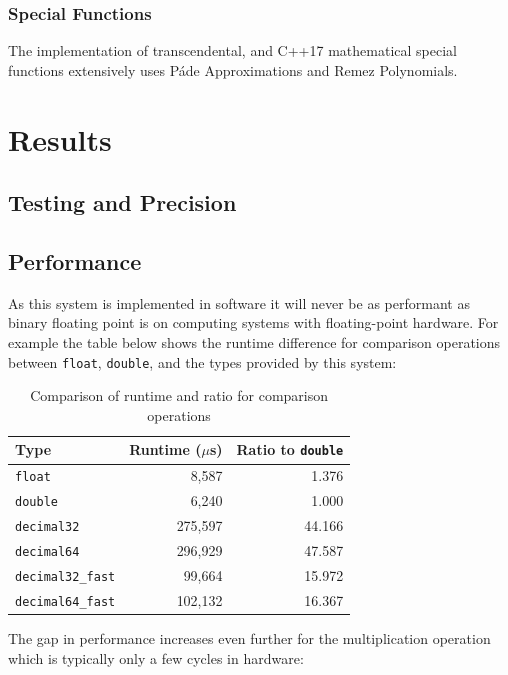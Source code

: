 \documentclass[acmsmall]{acmart}
\newcommand{\code}[1]{\texttt{#1}}
\begin{document}
\subsubsection{Special Functions}

The implementation of transcendental, and C++17 mathematical special functions\cite{cppreference_special_functions}\cite{iso_cpp23} extensively uses Páde Approximations and Remez Polynomials.

\section{Results}
\subsection{Testing and Precision}
\subsection{Performance}

As this system is implemented in software it will never be as performant as binary floating point is on computing systems with floating-point hardware.
For example the table below shows the runtime difference for comparison operations between \code{float}, \code{double}, and the types provided by this system:

\begin{table}[h]
\centering
\begin{tabular}{|l|r|r|}
\hline
Type & Runtime ($\mu$s) & Ratio to \texttt{double} \\
\hline
\texttt{float} & 8,587 & 1.376 \\
\texttt{double} & 6,240 & 1.000 \\
\texttt{decimal32} & 275,597 & 44.166 \\
\texttt{decimal64} & 296,929 & 47.587 \\
\texttt{decimal32\_fast} & 99,664 & 15.972 \\
\texttt{decimal64\_fast} & 102,132 & 16.367 \\
\hline
\end{tabular}
\caption{Comparison of runtime and ratio for comparison operations}
\label{tab:comp-comparison}
\end{table}

The gap in performance increases even further for the multiplication operation which is typically only a few cycles in hardware\cite{arm_trm}:
\end{document}

